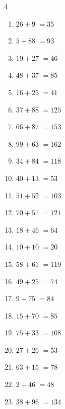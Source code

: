 \begin{multicols}{4}
\begin{enumerate}
  \item $26+9$
        $=35$

  \item $5+88$
        $=93$

  \item $19+27$
        $=46$

  \item $48+37$
        $=85$

  \item $16+25$
        $=41$

  \item $37+88$
        $=125$

\columnbreak %

  \item $66+87$
        $=153$

  \item $99+63$
        $=162$

  \item $34+84$
        $=118$

  \item $40+13$
        $=53$

  \item $51+52$
        $=103$

  \item $70+51$
        $=121$

  \item $18+46$
        $=64$

  \item $10+10$
        $=20$

  \item $58+61$
        $=119$

  \item $49+25$
        $=74$

  \item $9+75$
        $=84$

  \item $15+70$
        $=85$

  \item $75+33$
        $=108$

  \item $27+26$
        $=53$

  \item $63+15$
        $=78$

  \item $2+46$
        $=48$

  \item $38+96$
        $=134$


\end{enumerate}
\end{multicols}
